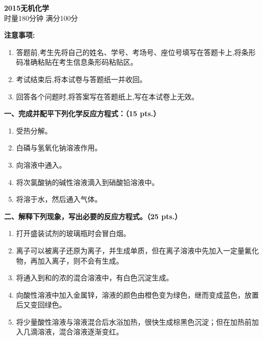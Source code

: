 \begin{center}
    {\LARGE \textbf{2015无机化学}} \\[2ex]
    {\large 时量180分钟 \quad 满分100分}
\end{center}

\vspace{0.5cm}
\noindent\textbf{注意事项:}
\begin{enumerate}[label=\arabic*., parsep=0pt, itemsep=0pt]
    \item 答题前,考生先将自己的姓名、学号、考场号、座位号填写在答题卡上,将条形码准确粘贴在考生信息条形码粘贴区。
    \item 考试结束后,将本试卷与答题纸一并收回。
    \item 回答各个问题时,将答案写在答题纸上,写在本试卷上无效。
\end{enumerate}

\vspace{0.5cm}
\noindent\textbf{一、完成并配平下列化学反应方程式：（15 pts.）}

\begin{enumerate}[label=\arabic*., start=1, itemsep=1.5ex]
    \item {}受热分解。
    \item 白磷与氢氧化钠溶液作用。
    \item 向溶液中通入。
    \item 将次氯酸钠的碱性溶液滴入到硝酸铅溶液中。
    \item 将溶于水，然后通入气体。
\end{enumerate}

\vspace{0.5cm}
\noindent\textbf{二、解释下列现象，写出必要的反应方程式。（25 pts.）}

\begin{enumerate}[label=\arabic*., start=1, itemsep=1.5ex]
    \item 打开盛装试剂的玻璃瓶时会冒白烟。
    \item {}离子可以被离子还原为离子，并生成单质，但在离子溶液中先加入一定量氟化物，再加入离子，则不会有生成。
    \item 将通入到和的浓的混合溶液中，有白色沉淀生成。
    \item 向酸性溶液中加入金属锌，溶液的颜色由橙色变为绿色，继而变成蓝色，放置后又变回绿色。
    \item 将少量酸性溶液与溶液混合后水浴加热，很快生成棕黑色沉淀；但在加热前加入几滴溶液，混合溶液逐渐变红。
\end{enumerate}

